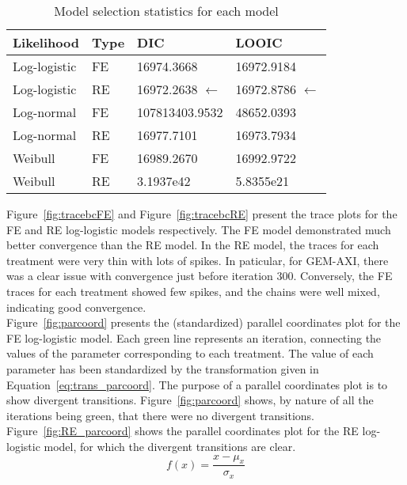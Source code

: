 \begin{table}[h]
    \centering
    \begin{tabular}{llll}
    \hline
    Likelihood   & Type & DIC         & LOOIC      \\ \hline
    Log-logistic & FE  & 16974.3668  & 16972.9184 \\
    Log-logistic & RE & 16972.2638  $\leftarrow$ & 16972.8786 $\leftarrow$ \\
    Log-normal   & FE  & 107813403.9532  & 48652.0393 \\
    Log-normal   & RE & 16977.7101  & 16973.7934 \\
    Weibull      & FE  & 16989.2670 & 16992.9722 \\
    Weibull      & RE & 3.1937e42 & 5.8355e21 \\ \hline
    \end{tabular}
    \caption{Model selection statistics for each model}
    \label{tab:selectionstatbc}
\end{table}

Figure~\ref{fig:tracebcFE} and Figure~\ref{fig:tracebcRE} present the trace plots for the FE and RE log-logistic models respectively. The FE model demonstrated much better convergence than the RE model. In the RE model, the traces for each treatment were very thin with lots of spikes. In paticular, for GEM-AXI, there was a clear issue with convergence just before iteration 300. Conversely, the FE traces for each treatment showed few spikes, and the chains were well mixed, indicating good convergence. \\

Figure~\ref{fig:parcoord} presents the (standardized) parallel coordinates plot for the FE log-logistic model. Each green line represents an iteration, connecting the values of the parameter corresponding to each treatment. The value of each parameter has been standardized by the transformation given in Equation~\ref{eq:trans_parcoord}. The purpose of a parallel coordinates plot is to show divergent transitions. Figure~\ref{fig:parcoord} shows, by nature of all the iterations being green, that there were no divergent transitions. Figure~\ref{fig:RE_parcoord} shows the parallel coordinates plot for the RE log-logistic model, for which the divergent transitions are clear.\\

\begin{equation}
    f(x) = \frac{x - \mu_x}{\sigma_x}
    \label{eq:trans_parcoord}
\end{equation}

